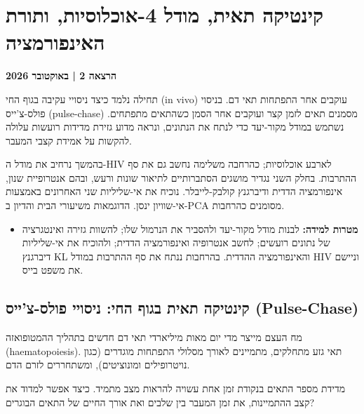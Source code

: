 
\chapter{קינטיקה תאית, מודל 4-אוכלוסיות, ותורת האינפורמציה}\label{chap:kinetics-information}
\noindent\textbf{הרצאה 2 \enspace| באוקטובר 2026}

\vspace{0.5em}
תחילה נלמד כיצד ניסויי עקיבה בגוף החי (\textenglish{in vivo}) עוקבים אחר התפתחות תאי דם. בניסוי פולס-צ'ייס (\textenglish{pulse-chase}) מסמנים תאים לזמן קצר ועוקבים אחר הסמן כשהתאים מתפתחים. נשתמש במודל מקור-יעד כדי לנתח את הנתונים, ונראה מדוע גזירת מדידות רועשות עלולה להקשות על אמידת קצבי המעבר.

בהמשך נרחיב את מודל ה-HIV לארבע אוכלוסיות; כהרחבה משלימה נחשב גם את סף ההתרבות. בחלק השני נגדיר מושגים הסתברותיים לתיאור שונות ורעש, ובהם אנטרופיית שנון, אינפורמציה הדדית ודיברגנץ קולבק-לייבלר. נוכיח את אי-שליליות שני האחרונים באמצעות אי-שוויון ינסן. הדוגמאות משיעורי הבית והדיון ב-PCA מסומנים כהרחבות.

\begin{itemize}[nosep]
\item \textbf{מטרות למידה:} לבנות מודל מקור-יעד ולהסביר את הנרמול שלו; להשוות גזירה ואינטגרציה של נתונים רועשים; לחשב אנטרופיה ואינפורמציה הדדית; ולהוכיח את אי-שליליות דיברגנץ KL והאינפורמציה ההדדית. בהרחבות ננתח את סף ההתרבות במודל HIV וניישם את משפט בייס.
\end{itemize}

\section{קינטיקה תאית בגוף החי: ניסויי פולס-צ'ייס (\texorpdfstring{\textenglish{Pulse-Chase}}{Pulse-Chase})}\label{sec:pulse-chase}
מח העצם מייצר מדי יום מאות מיליארדי תאי דם חדשים בתהליך ההמטופואזה (\textenglish{haematopoiesis}). תאי גזע מתחלקים, מתמיינים לאורך מסלולי התפתחות מוגדרים (כגון נויטרופילים ומונוציטים), ומשתחררים לזרם הדם. 

מדידת מספר התאים בנקודת זמן אחת עשויה להראות מצב מתמיד. כיצד אפשר למדוד את קצב ההתמיינות, את זמן המעבר בין שלבים ואת אורך החיים של התאים הבוגרים?

